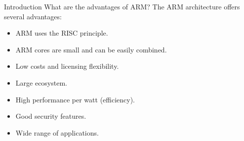 \documentclass{beamer}
\begin{document}
\begin{frame}{Introduction}
	{What are the advantages of ARM?}
	The ARM architecture offers several advantages:
	\begin{itemize}
		\item ARM uses the RISC principle.
		\item ARM cores are small and can be easily combined.
		\item Low costs and licensing flexibility.
		\item Large ecosystem.
		\item High performance per watt (efficiency).
		\item Good security features.
		\item Wide range of applications.
	\end{itemize}
\end{frame} 
\end{document}
